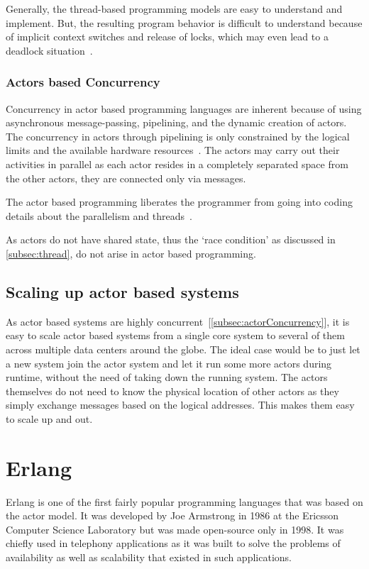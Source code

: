   Generally, the thread-based programming models are easy to understand and implement. But, the resulting program behavior is difficult to understand because of implicit context switches and release of locks, which may even lead to a deadlock situation~\cite{ambientTalk}.

\subsubsection{Actors based Concurrency}
\label{subsec:actorConcurrency}
  Concurrency in actor based programming languages are inherent because of using asynchronous message-passing, pipelining, and the dynamic creation of actors.
The concurrency in actors through pipelining is only constrained by the logical limits and the available hardware resources~\cite{agha}. The actors may carry out their activities in parallel as each actor resides in a completely separated space from the other actors, they are connected only via messages.

  The actor based programming liberates the programmer from going into coding details about the parallelism and threads~\cite{agha}.

  As actors do not have shared state, thus the ‘race condition’ as discussed in \autoref{subsec:thread}, do not arise in actor based programming.

\subsection{Scaling up actor based systems}
  As actor based systems are highly concurrent~[\autoref{subsec:actorConcurrency}], it is easy to scale actor based systems from a single core system to several of them across multiple data centers around the globe. The ideal case would be to just let a new system join the actor system and let it run some more actors during runtime, without the need of taking down the running system. The actors themselves do not need to know the physical location of other actors as they simply exchange messages based on the logical addresses. This makes them easy to scale up and out.

\section{Erlang}
\label{sec:erlang}
  Erlang is one of the first fairly popular programming languages that was based on the actor model\cite{vinoski}. It was developed by Joe Armstrong in 1986 at the Ericsson Computer Science Laboratory but was made open-source only in 1998. It was chiefly used in telephony applications as it was built to solve the problems of availability as well as scalability that existed in such applications.~\parencite{armstrong}


